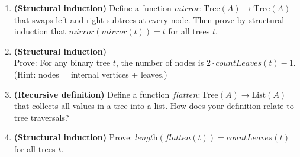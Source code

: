 \begin{enumerate}
  \item \textbf{(Structural induction)} Define a function $\textit{mirror}: \text{Tree}(A) \to \text{Tree}(A)$ that swaps left and right subtrees at every node. Then prove by structural induction that $\textit{mirror}(\textit{mirror}(t)) = t$ for all trees $t$.

  \item \textbf{(Structural induction)}\\
  Prove: For any binary tree $t$, the number of nodes is $2 \cdot \textit{countLeaves}(t) - 1$. (Hint: nodes = internal vertices + leaves.)

  \item \textbf{(Recursive definition)} Define a function $\textit{flatten}: \text{Tree}(A) \to \text{List}(A)$ that collects all values in a tree into a list. How does your definition relate to tree traversals?

  \item \textbf{(Structural induction)} Prove: $\textit{length}(\textit{flatten}(t)) = \textit{countLeaves}(t)$ for all trees $t$.
\end{enumerate}
